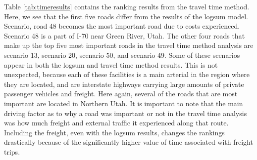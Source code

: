 Table \ref{tab:timeresults} contains the ranking results from the travel
time method. Here, we see that the first five roads differ from the
results of the logsum model. Scenario, road 48 becomes the most important
road due to costs experienced. Scenario 48 is a part of I-70 near Green River,
Utah. The other four roads that make up the top five most important roads
in the travel time method analysis are scenario 13, scenario 20, scenario 50, and scenario
49. Some of these scenarios appear in both the logsum and travel time method
results. This is not unexpected, because each of these facilities is a main
arterial in the region where they are located, and are interstate highways
carrying large amounts of private passenger vehicles and freight.
Here again, several of the roads that are most important are located in
Northern Utah. It is important to note that the main driving factor as to
why a road was important or not in the travel time analysis was how much
freight and external traffic it experienced along that route. Including
the freight, even with the logsum results, changes the rankings
drastically because of the significantly higher value of time associated
with freight trips.

